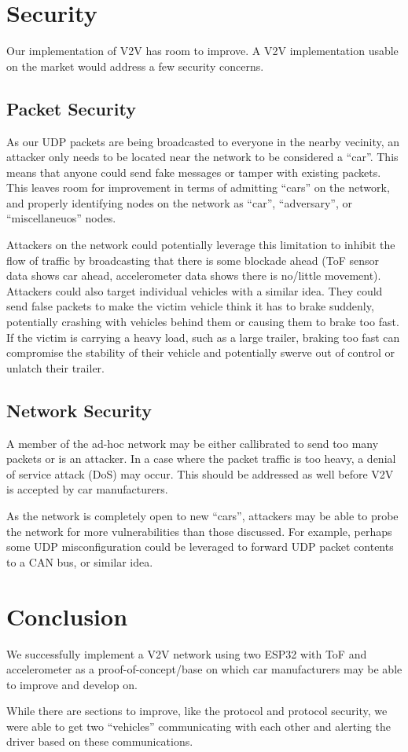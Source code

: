 \documentclass[conference]{IEEEtran}
\begin{document}
\section{Security}
Our implementation of V2V has room to improve. A V2V implementation usable on
the market would address a few security concerns.

\subsection{Packet Security}
As our UDP packets are being broadcasted to everyone in the nearby vecinity, an
attacker only needs to be located near the network to be considered a ``car''.
This means that anyone could send fake messages or tamper with existing packets.
This leaves room for improvement in terms of admitting ``cars'' on the network,
and properly identifying nodes on the network as ``car'', ``adversary'', or
``miscellaneuos'' nodes.

Attackers on the network could potentially leverage this limitation to inhibit
the flow of traffic by broadcasting that there is some blockade ahead (ToF
sensor data shows car ahead, accelerometer data shows there is no/little
movement). Attackers could also target individual vehicles with a similar idea.
They could send false packets to make the victim vehicle think it has to brake
suddenly, potentially crashing with vehicles behind them or causing them to
brake too fast. If the victim is carrying a heavy load, such as a large trailer,
braking too fast can compromise the stability of their vehicle and potentially
swerve out of control or unlatch their trailer.

\subsection{Network Security}
A member of the ad-hoc network may be either callibrated to send too many
packets or is an attacker. In a case where the packet traffic is too heavy, a
denial of service attack (DoS) may occur. This should be addressed as well
before V2V is accepted by car manufacturers.

As the network is completely open to new ``cars'', attackers may be able to
probe the network for more vulnerabilities than those discussed. For example,
perhaps some UDP misconfiguration could be leveraged to forward UDP packet
contents to a CAN bus, or similar idea.

\section{Conclusion}
We successfully implement a V2V network using two ESP32 with ToF and
accelerometer as a proof-of-concept/base on which car manufacturers may be able
to improve and develop on.

While there are sections to improve, like the protocol and protocol security, we
were able to get two ``vehicles'' communicating with each other and alerting the
driver based on these communications.



\end{document}
